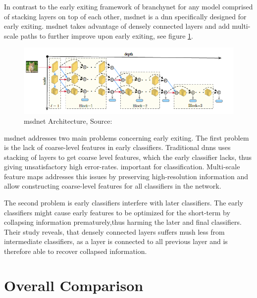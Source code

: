 In contrast to the early exiting framework of \gls{branchynet} for any model comprised of stacking layers on top of each other, \gls{msdnet} \cite{huang_multi-scale_2017} is a \gls{dnn} specifically designed for early exiting. \gls{msdnet} takes advantage of densely connected layers and add multi-scale paths to further improve upon early exiting, see figure \ref{fig:msdnet}.

\begin{figure}
	\centering
	\includegraphics[width=\linewidth]{figures/models/msdnet}
	\caption[\gls{msdnet} Architecture]{\gls{msdnet} Architecture, Source:  \cite{huang_multi-scale_2017}}
	\label{fig:msdnet}
\end{figure}

\gls{msdnet} addresses two main problems concerning early exiting. The first problem is the lack of coarse-level features in early classifiers. Traditional \gls{dnn}s uses stacking of layers to get coarse level features, which the early classifier lacks, thus giving unsatisfactory high error-rates. important for classification. Multi-scale feature maps addresses this issues by preserving high-resolution information and allow constructing coarse-level features for all classifiers in the network.

The second problem is early classifiers interfere with later classifiers. The early classifiers might cause early features to be optimized for the short-term by collapsing information prematurely,thus harming the later and final classifiers. Their study reveals, that densely connected layers suffers mush less from intermediate classifiers, as a layer is connected to all previous layer and is therefore able to recover collapsed information.


\section{Overall Comparison}


